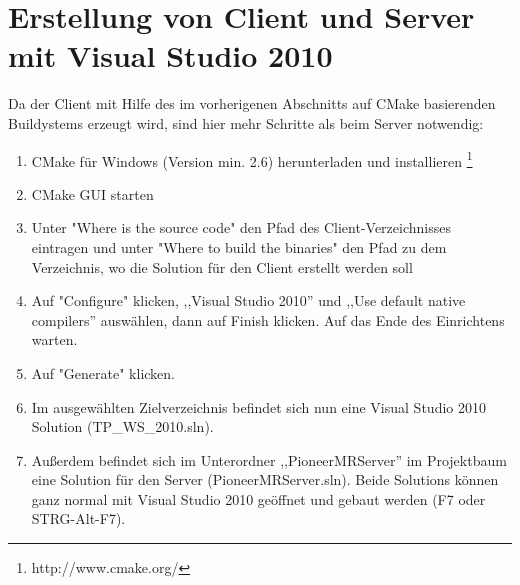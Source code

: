 

\section{Erstellung von Client und Server mit Visual Studio  2010}
Da der Client mit Hilfe des im vorherigenen Abschnitts auf CMake
basierenden Buildystems erzeugt wird, sind hier mehr Schritte als beim
Server notwendig:
\begin{enumerate}
	\item CMake für Windows (Version min. 2.6) herunterladen und installieren
  \footnote{http://www.cmake.org/}
	\item CMake GUI starten
	\item Unter "Where is the source code" den Pfad des Client-Verzeichnisses
 eintragen und unter "Where to build the binaries" den Pfad zu dem
Verzeichnis, wo die Solution für den Client erstellt werden soll
	\item Auf "Configure" klicken, ,,Visual Studio 2010'' und ,,Use default
native compilers'' auswählen, dann auf Finish klicken. Auf das Ende des
Einrichtens warten.
	\item Auf "Generate" klicken.
	\item Im ausgewählten Zielverzeichnis befindet sich nun eine
          Visual Studio 2010
Solution (TP\_WS\_2010.sln). 
\item Außerdem befindet sich im Unterordner ,,PioneerMRServer'' im
Projektbaum eine Solution für den
Server (PioneerMRServer.sln). Beide Solutions können ganz normal mit 
Visual Studio 2010 geöffnet und gebaut werden (F7 oder STRG-Alt-F7).
\end{enumerate}

